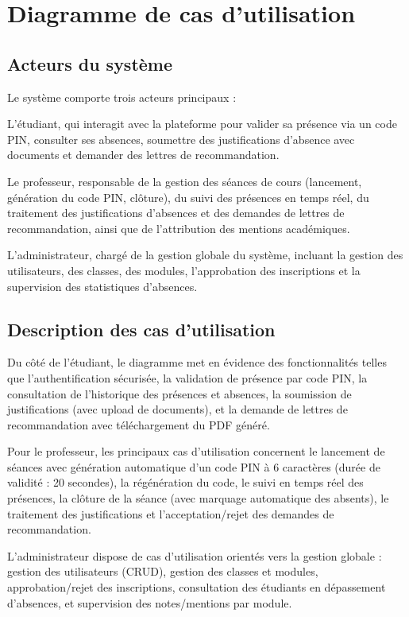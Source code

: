 \documentclass[12pt, a4paper, openright]{report}
\begin{document}
\section{Diagramme de cas d'utilisation}

\subsection{Acteurs du système}

Le système comporte trois acteurs principaux :

L'étudiant, qui interagit avec la plateforme pour valider sa présence via un code PIN, consulter ses absences, soumettre des justifications d'absence avec documents et demander des lettres de recommandation.

Le professeur, responsable de la gestion des séances de cours (lancement, génération du code PIN, clôture), du suivi des présences en temps réel, du traitement des justifications d'absences et des demandes de lettres de recommandation, ainsi que de l'attribution des mentions académiques.

L'administrateur, chargé de la gestion globale du système, incluant la gestion des utilisateurs, des classes, des modules, l'approbation des inscriptions et la supervision des statistiques d'absences.

\subsection{Description des cas d'utilisation}

Du côté de l'étudiant, le diagramme met en évidence des fonctionnalités telles que l'authentification sécurisée, la validation de présence par code PIN, la consultation de l'historique des présences et absences, la soumission de justifications (avec upload de documents), et la demande de lettres de recommandation avec téléchargement du PDF généré.

Pour le professeur, les principaux cas d'utilisation concernent le lancement de séances avec génération automatique d'un code PIN à 6 caractères (durée de validité : 20 secondes), la régénération du code, le suivi en temps réel des présences, la clôture de la séance (avec marquage automatique des absents), le traitement des justifications et l'acceptation/rejet des demandes de recommandation.

L'administrateur dispose de cas d'utilisation orientés vers la gestion globale : gestion des utilisateurs (CRUD), gestion des classes et modules, approbation/rejet des inscriptions, consultation des étudiants en dépassement d'absences, et supervision des notes/mentions par module.
\end{document}
